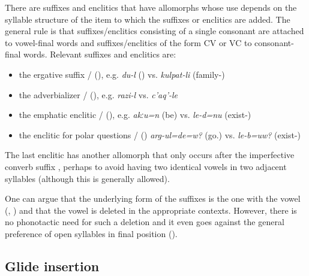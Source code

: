 There are suffixes and enclitics that have allomorphs whose use depends on the syllable structure of the item to which the suffixes or enclitics are added. The general rule is that suffixes\slash enclitics consisting of a single consonant are attached to vowel-final words and suffixes\slash enclitics of the form CV or VC to consonant-final words. Relevant suffixes and enclitics are:
%
\begin{itemize}
	\item	the ergative suffix \slash{} (), e.g. \textit{du-l} () vs. \textit{kulpat-li} (family-)
	\item	the adverbializer \slash{} (), e.g. \textit{razi-l}  vs. \textit{c'aq'-le} 
	\item	the emphatic enclitic \slash{} (), e.g. \textit{akːu=n} (be) vs. \textit{le-d=nu} (exist-)
	\item	the enclitic for polar questions \slash{} () \textit{arg-ul=de=w?} (go.)  vs. \textit{le-b=uw?} (exist-) 
\end{itemize}

The last enclitic has another allomorph  that only occurs after the imperfective converb suffix , perhaps to avoid having two identical vowels in two adjacent syllables (although this is generally allowed).

One can argue that the underlying form of the suffixes is the one with the vowel (, ) and that the vowel is deleted in the appropriate contexts. However, there is no phonotactic need for such a deletion and it even goes against the general preference of open syllables in final position ().



\subsection{Glide insertion}
\label{ssec:Glide insertion}

